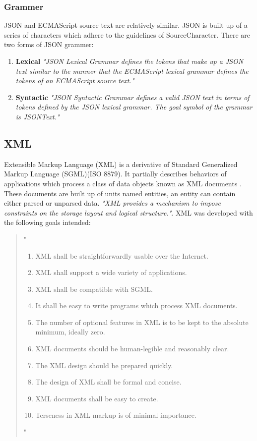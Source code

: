 \subsubsection{Grammer}
JSON and ECMAScript source text are relatively similar. JSON is built up of a series of characters which adhere to the guidelines of SourceCharacter. There are two forms of JSON grammer:
\begin{enumerate}
\item \textbf{Lexical} \emph{"JSON Lexical Grammar defines the tokens that make up a JSON text similar to the manner that the ECMAScript lexical grammar defines the tokens of an ECMAScript source text."\cite{ecma}} 
\item \textbf{Syntactic} \emph{"JSON Syntactic Grammar defines a valid JSON text in terms of tokens defined by the JSON lexical grammar. The goal symbol of the grammar is JSONText."\cite{ecma}}
\end{enumerate}

\subsection{XML}
	Extensible Markup Language (XML) is a derivative of Standard Generalized Markup Language (SGML)(ISO 8879). It partially describes behaviors of applications which process a class of data objects known as XML documents \cite{w3c}. These documents are built up of units named entities, an entity can contain either parsed or unparsed data. \emph{"XML provides a mechanism to impose constraints on the storage layout and logical structure."}\cite{w3c}. XML was developed with the following goals intended:
\begin{quotation}"
\begin{enumerate}
 \item XML shall be straightforwardly usable over the Internet.
	\item XML shall support a wide variety of applications.
	\item XML shall be compatible with SGML.
	\item It shall be easy to write programs which process XML documents.
	\item The number of optional features in XML is to be kept to the absolute minimum, ideally zero.
	\item XML documents should be human-legible and reasonably clear.
	\item The XML design should be prepared quickly.
	\item The design of XML shall be formal and concise.
	\item XML documents shall be easy to create.
	\item Terseness in XML markup is of minimal importance.
    \end{enumerate}"\cite{w3c}
\end{quotation}


